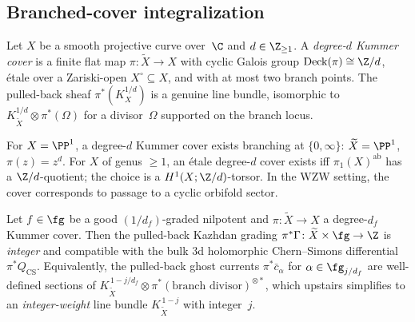 \subsection{Branched-cover integralization}
\label{subsec:branched-cover}

\begin{definition}
\label{def:branched-cover-integralization}
Let $X$ be a smooth projective curve over~$\C$ and $d \in \Z_{\ge 1}$.
A \emph{degree-$d$ Kummer cover} is a finite flat map
$\pi\colon \widetilde X \to X$ with cyclic Galois group
$\mathrm{Deck}(\pi) \cong \Z/d$, \'etale over a Zariski-open
$X^{\circ} \subseteq X$, and with at most two branch points.
The pulled-back sheaf $\pi^{*}(K_{X}^{1/d})$ is a genuine line
bundle, isomorphic to~$K_{\widetilde X}^{1/d} \otimes \pi^{*}(\Omega)$
for a divisor~$\Omega$ supported on the branch locus.
\end{definition}

\begin{remark}
\label{rem:branched-cover-existence}
For $X = \PP^{1}$, a degree-$d$ Kummer cover exists branching at
$\{0, \infty\}$: $\widetilde X = \PP^{1}$, $\pi(z) = z^{d}$. For
$X$ of genus $\ge 1$, an \'etale degree-$d$ cover exists iff
$\pi_{1}(X)^{\mathrm{ab}}$ has a $\Z/d$-quotient; the choice is a
$H^{1}(X; \Z/d)$-torsor. In the WZW setting, the cover corresponds
to passage to a cyclic orbifold sector.
\end{remark}

\begin{theorem}
\label{thm:branched-cover-integralization}
\ClaimStatusProvedHere{}
Let $f \in \fg$ be a good $(1/d_{f})$-graded nilpotent and
$\pi\colon \widetilde X \to X$ a degree-$d_{f}$ Kummer cover. Then the
pulled-back Kazhdan grading
$\pi^{*}\Gamma\colon \widetilde X \times \fg \to \Z$
is \emph{integer} and compatible with the bulk $3$d holomorphic
Chern--Simons differential $\pi^{*}Q_{\mathrm{CS}}$. Equivalently,
the pulled-back ghost currents $\pi^{*}\bar c_{\alpha}$ for
$\alpha \in \fg_{j/d_{f}}$ are well-defined sections of
$K_{\widetilde X}^{\,1-j/d_{f}}\otimes \pi^{*}(\text{branch divisor})^{\otimes *}$,
which upstairs simplifies to an \emph{integer-weight} line bundle
$K_{\widetilde X}^{\,1-j}$ with integer~$j$.
\end{theorem}

